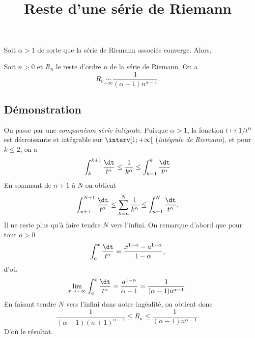 \documentclass[fontsize=12pt,twoside=false,parskip=half, french]{scrartcl}
\title{Reste d'une série de Riemann}
\date{}
\author{}
\begin{document}
\maketitle
    Soit $\alpha > 1$ de sorte que la série de Riemann associée converge. Alors,
   \begin{Theoreme}
      Soit $n > 0$ et $R_n$ le reste d'ordre $n$ de la série de Riemann. On a
      \[
         R_n \underset{+\infty}{\sim} \frac{1}{(\alpha - 1)n^{\alpha - 1}}.
      \]
   \end{Theoreme}
   \subsection{Démonstration}
      On passe par une \emph{comparaison série-intégrale}. Puisque $\alpha > 1$,
      la fonction $t \mapsto 1/t^\alpha$ est décroissante et intégrable sur
      $\interv[1; +\infty[$ (\emph{intégrale de Riemann}), et pour $k \leq 2$,
      on a
      \[
         \int_k^{k +1} \frac{\dt}{t^\alpha} \leq \frac{1}{k^\alpha} \leq \int_{k - 1}^{k} \frac{\dt}{t^\alpha}
      \]
      En sommant de $n + 1$ à $N$ on obtient
      \[
         \int_{n + 1}^{N +1} \frac{\dt}{t^\alpha} \leq \sum_{k = n}^{N} \frac{1}{k^\alpha} \leq \int_{n + 1}^{N} \frac{\dt}{t^\alpha}.
      \]
      Il ne reste plus qu'à faire tendre $N$ vers l'infini. On remarque d'abord que pour tout  $a > 0$
      \[
         \int_{a}^{x} \frac{\dt}{t^\alpha} = 
         \frac{x^{1-\alpha} - a^{1- \alpha}}{1 - \alpha},   
      \]
      d'où
      \[
         \lim_{x \to +\infty} \int_{a}^{x} \frac{\dt}{t^\alpha} = 
         \frac{a^{1- \alpha}}{\alpha - 1} = 
         \frac{1}{(\alpha - 1)a^{\alpha - 1}}.
      \]
      En faisant tendre $N$ vers l'infini dans notre ingéalité, on obtient donc
      \[
         \frac{1}{(\alpha - 1)(n + 1)^{\alpha - 1}} \leq 
         R_n \leq
         \frac{1}{(\alpha - 1)n^{\alpha - 1}}.
      \]
      D'où le résultat.
\end{document}
